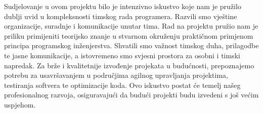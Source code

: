 		 Sudjelovanje u ovom projektu bilo je intenzivno iskustvo koje nam je pružilo dublji uvid u kompleksnosti timskog rada programera. Razvili smo vještine organizacije, suradnje i komunikacije unutar tima. Rad na projektu pružio nam je priliku primijeniti teorijsko znanje u stvarnom okruženju praktičnom primjenom principa programskog inženjerstva. Shvatili smo važnost timskog duha, prilagodbe te jasne komunikacije, a istovremeno smo svjesni prostora za osobni i timski napredak. Za brže i kvalitetnije izvođenje projekata u budućnosti, prepoznajemo potrebu za usavršavanjem u područjima agilnog upravljanja projektima, testiranja softvera te optimizacije koda. Ovo iskustvo postat će temelj našeg profesionalnog razvoja, osiguravajući da budući projekti budu izvedeni s još većim uspjehom.
		 
		 
		 
		 
		 
		 
		
		 
		  
		 
		 
		 
		 
		
		\eject 